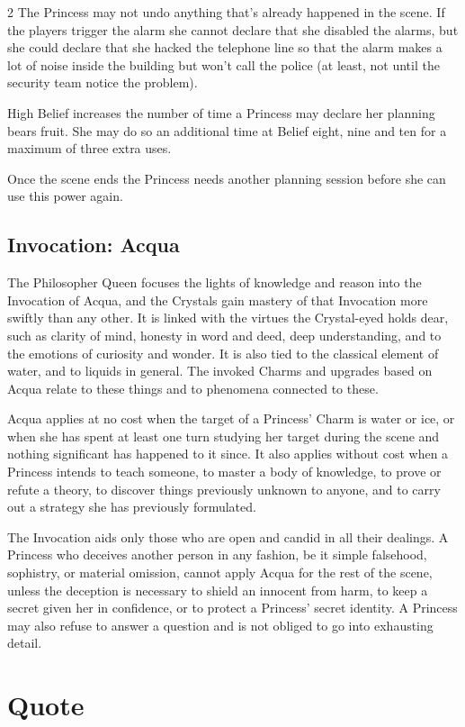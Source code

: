\begin{multicols}{2}
The Princess may not undo anything that's already happened in the scene. If the players trigger the alarm she cannot declare that she disabled the alarms, but she could declare that she hacked the telephone line so that the alarm makes a lot of noise inside the building but won't call the police (at least, not until the security team notice the problem).

High Belief increases the number of time a Princess may declare her planning bears fruit. She may do so an additional time at Belief eight, nine and ten for a maximum of three extra uses. 

Once the scene ends the Princess needs another planning session before she can use this power again. 
\subsection*{Invocation: Acqua}
The Philosopher Queen focuses the lights of knowledge and reason into the Invocation of Acqua, and the Crystals gain mastery of that Invocation more swiftly than any other. It is linked with the virtues the Crystal-eyed holds dear, such as clarity of mind, honesty in word and deed, deep understanding, and to the emotions of curiosity and wonder. It is also tied to the classical element of water, and to liquids in general. The invoked Charms and upgrades based on Acqua relate to these things and to phenomena connected to these.

Acqua applies at no cost when the target of a Princess' Charm is water or ice, or when she has spent at least one turn studying her target during the scene and nothing significant has happened to it since. It also applies without cost when a Princess intends to teach someone, to master a body of knowledge, to prove or refute a theory, to discover things previously unknown to anyone, and to carry out a strategy she has previously formulated.

The Invocation aids only those who are open and candid in all their dealings. A Princess who deceives another person in any fashion, be it simple falsehood, sophistry, or material omission, cannot apply Acqua for the rest of the scene, unless the deception is necessary to shield an innocent from harm, to keep a secret given her in confidence, or to protect a Princess' secret identity. A Princess may also refuse to answer a question and is not obliged to go into exhausting detail.

\section*{Quote}


\end{multicols}
